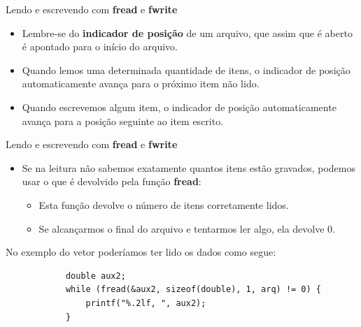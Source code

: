 \documentclass[handout]{beamer}
\begin{document}
\begin{frame}[fragile]{Lendo e escrevendo com \textbf{fread} e \textbf{fwrite}}

    \begin{itemize}
        \item Lembre-se do \textbf{indicador de posição} de um arquivo, que assim que é aberto
        é apontado para o início do arquivo.
        \item Quando lemos uma determinada quantidade de itens, o indicador de posição automaticamente
        avança para o próximo item não lido.
        \item Quando escrevemos algum item, o indicador de posição automaticamente avança para
        a posição seguinte ao item escrito.
    \end{itemize}

\end{frame}

\begin{frame}[fragile]{Lendo e escrevendo com \textbf{fread} e \textbf{fwrite}}

    \begin{itemize}
        \item Se na leitura não sabemos exatamente quantos itens estão gravados, podemos
        usar o que é devolvido pela função \textbf{fread}:
        \begin{itemize}
            \item Esta função devolve o número de itens corretamente lidos.
            \item Se alcançarmos o final do arquivo e tentarmos ler algo, ela devolve 0.
        \end{itemize}
    \end{itemize}

    No exemplo do vetor poderíamos ter lido os dados como segue:
    \begin{small}
        \begin{verbatim}
            double aux2;
            while (fread(&aux2, sizeof(double), 1, arq) != 0) {
                printf("%.2lf, ", aux2);
            }
        \end{verbatim}
    \end{small}

\end{frame}
\end{document}
